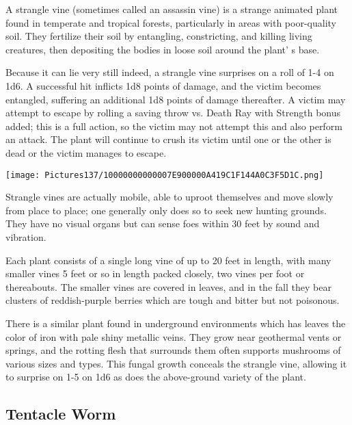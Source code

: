 \documentclass[a4paper,twoside,openany,10pt]{book}
\begin{document}
\begin{multicols}{2}
A strangle vine (sometimes called an assassin vine) is a strange animated plant found in temperate and tropical forests, particularly in areas with poor-quality soil. They fertilize their soil by entangling, constricting, and killing living creatures, then depositing the bodies in loose soil around the plant' s base.

Because it can lie very still indeed, a strangle vine surprises on a roll of 1-4 on 1d6. A successful hit inflicts 1d8 points of damage, and the victim becomes entangled, suffering an additional 1d8 points of damage thereafter. A victim may attempt to escape by rolling a saving throw vs. Death Ray with Strength bonus added; this is a full action, so the victim may not attempt this and also perform an attack. The plant will continue to crush its victim until one or the other is dead or the victim manages to escape.


\begin{center} \texttt{[image: Pictures137/10000000000007E900000A419C1F144A0C3F5D1C.png]} \end{center}

Strangle vines are actually mobile, able to uproot themselves and move slowly from place to place; one generally only does so to seek new hunting grounds. They have no visual organs but can sense foes within 30 feet by sound and vibration.

Each plant consists of a single long vine of up to 20 feet in length, with many smaller vines 5 feet or so in length packed closely, two vines per foot or thereabouts. The smaller vines are covered in leaves, and in the fall they bear clusters of reddish-purple berries which are tough and bitter but not poisonous.

There is a similar plant found in underground environments which has leaves the color of iron with pale shiny metallic veins. They grow near geothermal vents or springs, and the rotting flesh that surrounds them often supports mushrooms of various sizes and types. This fungal growth conceals the strangle vine, allowing it to surprise on 1-5 on 1d6 as does the above-ground variety of the plant.

\subsection*{Tentacle Worm}\label{tentacle-worm}


\end{multicols}
\end{document}
